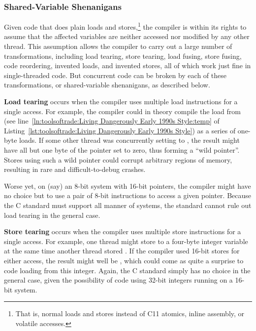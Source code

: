 \subsubsection{Shared-Variable Shenanigans}
\label{sec:toolsoftrade:Shared-Variable Shenanigans}

Given code that does plain loads and stores,\footnote{
	That is, normal loads and stores instead of C11 atomics, inline
	assembly, or volatile accesses.}
the compiler is within
its rights to assume that the affected variables are neither accessed
nor modified by any other thread.
This assumption allows the compiler to carry out a large number of
transformations, including load tearing, store tearing,
load fusing, store fusing, code reordering, invented loads, and
invented stores, all of which work just fine in single-threaded code.
But concurrent code can be broken by each of these transformations,
or shared-variable shenanigans, as described below.

{\bf Load tearing} occurs when the compiler uses multiple load
instructions for a single access.
For example, the compiler could in theory compile the load from
 (see
line~\ref{ln:toolsoftrade:Living Dangerously Early 1990s Style:temp} of
Listing~\ref{lst:toolsoftrade:Living Dangerously Early 1990s Style})
as a series of one-byte loads.
If some other thread was concurrently setting  to
, the result might have all but one byte of the pointer
set to zero, thus forming a ``wild pointer''.
Stores using such a wild pointer could corrupt arbitrary
regions of memory, resulting in rare and difficult-to-debug crashes.

Worse yet, on (say) an 8-bit system with 16-bit pointers, the compiler
might have no choice but to use a pair of 8-bit instructions to access
a given pointer.
Because the C standard must support all manner of systems, the standard
cannot rule out load tearing in the general case.

{\bf Store tearing} occurs when the compiler uses multiple store
instructions for a single access.
For example, one thread might store  to a four-byte integer
variable at the same time another thread stored .
If the compiler used 16-bit stores for either access, the result
might well be , which could come as quite a surprise to
code loading from this integer.
Again, the C standard simply has no choice in the general case, given
the possibility of code using 32-bit integers running on a 16-bit system.


